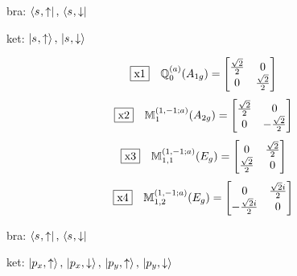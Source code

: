 \documentclass[fleqn,10pt,landscape]{jsarticle}
\begin{document}
\noindent\textbullet\, bra: $\bra{s_{},\uparrow},\, \bra{s_{},\downarrow}$

\noindent\textbullet\, ket: $\ket{s_{},\uparrow},\, \ket{s_{},\downarrow}$

\begin{dmath*}
\fbox{x1}\quad \mathbb{Q}_{0}^{(a)}(A_{1g})=\begin{bmatrix} \frac{\sqrt{2}}{2} & 0 \\ 0 & \frac{\sqrt{2}}{2} \end{bmatrix}
\end{dmath*}
\begin{dmath*}
\fbox{x2}\quad \mathbb{M}_{1}^{(1,-1;a)}(A_{2g})=\begin{bmatrix} \frac{\sqrt{2}}{2} & 0 \\ 0 & - \frac{\sqrt{2}}{2} \end{bmatrix}
\end{dmath*}
\begin{dmath*}
\fbox{x3}\quad \mathbb{M}_{1,1}^{(1,-1;a)}(E_{g})=\begin{bmatrix} 0 & \frac{\sqrt{2}}{2} \\ \frac{\sqrt{2}}{2} & 0 \end{bmatrix}
\end{dmath*}
\begin{dmath*}
\fbox{x4}\quad \mathbb{M}_{1,2}^{(1,-1;a)}(E_{g})=\begin{bmatrix} 0 & \frac{\sqrt{2} i}{2} \\ - \frac{\sqrt{2} i}{2} & 0 \end{bmatrix}
\end{dmath*}
\vspace{5mm}

\noindent\textbullet\, bra: $\bra{s_{},\uparrow},\, \bra{s_{},\downarrow}$

\noindent\textbullet\, ket: $\ket{p_{x},\uparrow},\, \ket{p_{x},\downarrow},\, \ket{p_{y},\uparrow},\, \ket{p_{y},\downarrow}$
\end{document}
